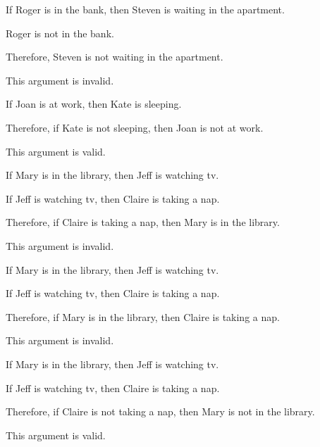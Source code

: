 \begin{enumerate}[(1)]
\noindent\begin{minipage}{0.99\textwidth}
\item
\begin{earg}
\item If Roger is in the bank, then Steven is waiting in the apartment.
\item Roger is not in the bank.
\item Therefore, Steven is not waiting in the apartment.
\end{earg}
\smallskip
\noindent This argument is invalid.
\end{minipage}

\item
\begin{earg}
\item If Joan is at work, then Kate is sleeping.
\item Therefore, if Kate is not sleeping, then Joan is not at work.
\end{earg}
\noindent This argument is valid.

\item
\begin{earg}
\item If Mary is in the library, then Jeff is watching tv.
\item If Jeff is watching tv, then Claire is taking a nap.
\item Therefore, if Claire is taking a nap, then Mary is in the library.
\end{earg}
\noindent This argument is invalid.

\item
\begin{earg}
\item If Mary is in the library, then Jeff is watching tv.
\item If Jeff is watching tv, then Claire is taking a nap.
\item Therefore, if Mary is in the library, then Claire is taking a nap.
\end{earg}
\noindent This argument is invalid.

\item
\begin{earg}
\item If Mary is in the library, then Jeff is watching tv.
\item If Jeff is watching tv, then Claire is taking a nap.
\item Therefore, if Claire is not taking a nap, then Mary is not in the library.
\end{earg}
\noindent This argument is valid.


\end{enumerate}
